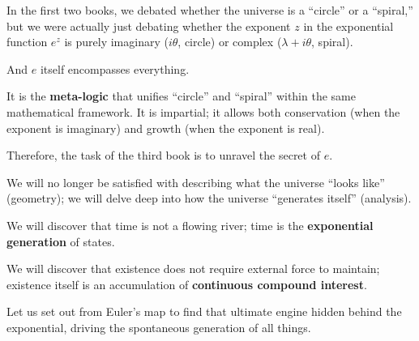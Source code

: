 In the first two books, we debated whether the universe is a ``circle'' or a ``spiral,'' but we were actually just debating whether the exponent $z$ in the exponential function $e^{z}$ is purely imaginary ($i\theta$, circle) or complex ($\lambda + i\theta$, spiral).

And \textbf{$e$} itself encompasses everything.

It is the \textbf{meta-logic} that unifies ``circle'' and ``spiral'' within the same mathematical framework. It is impartial; it allows both conservation (when the exponent is imaginary) and growth (when the exponent is real).

Therefore, the task of the third book is to unravel the secret of \textbf{$e$}.

We will no longer be satisfied with describing what the universe ``looks like'' (geometry); we will delve deep into how the universe ``generates itself'' (analysis).

We will discover that time is not a flowing river; time is the \textbf{exponential generation} of states.

We will discover that existence does not require external force to maintain; existence itself is an accumulation of \textbf{continuous compound interest}.

Let us set out from Euler's map to find that ultimate engine hidden behind the exponential, driving the spontaneous generation of all things.

